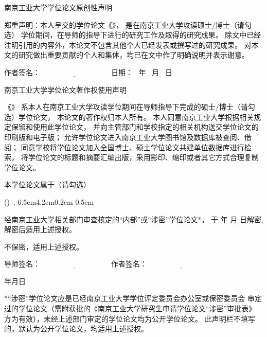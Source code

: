 \thispagestyle{empty}

\vspace*{1em}

{
\linespread{1.4}
\centerline{\STSong 南京工业大学学位论文原创性声明}

\bigskip

郑重声明：本人呈交的学位论文《\cctitle》，
是在南京工业大学攻读硕士/博士（请勾选）
学位期间，在导师的指导下进行的研究工作及取得的研究成果。
除文中已经注明引用的内容外，本论文不包含其他个人已经发表或撰写过的研究成果。
对本文的研究做出重要贡献的个人和集体，均已在文中作了明确说明并表示谢意。

\vspace{1em}


{\STSong 作者签名}：$\underline{\hspace{4cm}}$ \hfill
{\STSong 日\quad 期}： \qquad\ 年 \quad\ 月 \quad\ 日 \qquad\mbox{}

\vspace{4em}

\centerline{\STSong 南京工业大学学位论文著作权使用声明}
\bigskip


《\cctitle》
系本人在南京工业大学攻读学位期间在导师指导下完成的硕士/博士（请勾选）学位论文，
本论文的著作权归本人所有。
本人同意南京工业大学根据相关规定保留和使用此学位论文，
并向主管部门和学校指定的相关机构送交学位论文的印刷版和电子版；
允许学位论文进入南京工业大学图书馆及数据库被查阅、借阅；
同意学校将学位论文加入全国博士、硕士学位论文共建单位数据库进行检索，
将学位论文的标题和摘要汇编出版，采用影印、缩印或者其它方式合理复制学位论文。

本学位论文属于（请勾选）
\begin{list}{{\hfill\upshape (\qquad)\ . }}{%
     \leftmargin6.5em4.2em0.2em
     \itemsep0.5em}

\item 经南京工业大学相关部门审查核定的“内部”或“涉密”学位论文*，
  于 \qquad 年 \quad 月 \quad  日解密, 解密后适用上述授权。

\item 不保密，适用上述授权。
\end{list}

\vskip0.8cm


{\STSong 导师签名}：$\underline{\hspace{4cm}}$ \hfill
{\STSong 作者签名}：$\underline{\hspace{4cm}}$

\bigskip

{\mbox{}\hfill 年\qquad 月\qquad  日 }

\vfill

\parbox[t]{0.946\textwidth}{
*“涉密”学位论文应是已经南京工业大学学位评定委员会办公室或保密委员会
审定过的学位论文（需附获批的《南京工业大学研究生申请学位论文“涉密”审批表》
方为有效），未经上述部门审定的学位论文均为公开学位论文。
此声明栏不填写的，默认为公开学位论文，均适用上述授权。\\
}}

